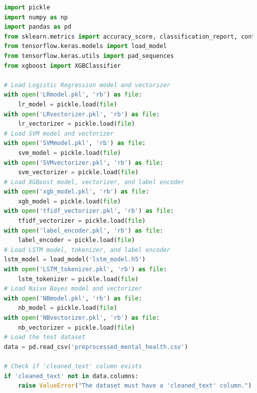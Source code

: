 \begin{tcolorbox}[colback=gray!5!white, colframe=gray!80!black, boxrule=0.5pt, title=Evaluate Meta-Learner and Ensemble Model]
    \begin{lstlisting}[language=Python]
import pickle
import numpy as np
import pandas as pd
from sklearn.metrics import accuracy_score, classification_report, confusion_matrix
from tensorflow.keras.models import load_model
from tensorflow.keras.utils import pad_sequences
from xgboost import XGBClassifier

# Load Logistic Regression model and vectorizer
with open('LRmodel.pkl', 'rb') as file:
    lr_model = pickle.load(file)
with open('LRvectorizer.pkl', 'rb') as file:
    lr_vectorizer = pickle.load(file)
# Load SVM model and vectorizer
with open('SVMmodel.pkl', 'rb') as file:
    svm_model = pickle.load(file)
with open('SVMvectorizer.pkl', 'rb') as file:
    svm_vectorizer = pickle.load(file)
# Load XGBoost model, vectorizer, and label encoder
with open('xgb_model.pkl', 'rb') as file:
    xgb_model = pickle.load(file)
with open('tfidf_vectorizer.pkl', 'rb') as file:
    tfidf_vectorizer = pickle.load(file)
with open('label_encoder.pkl', 'rb') as file:
    label_encoder = pickle.load(file)
# Load LSTM model, tokenizer, and label encoder
lstm_model = load_model('lstm_model.h5')
with open('LSTM_tokenizer.pkl', 'rb') as file:
    lstm_tokenizer = pickle.load(file)
# Load Naive Bayes model and vectorizer
with open('NBmodel.pkl', 'rb') as file:
    nb_model = pickle.load(file)
with open('NBvectorizer.pkl', 'rb') as file:
    nb_vectorizer = pickle.load(file)
# Load the test dataset
data = pd.read_csv('preprocessed_mental_health.csv')

# Check if 'cleaned_text' column exists
if 'cleaned_text' not in data.columns:
    raise ValueError("The dataset must have a 'cleaned_text' column.")
\end{lstlisting}
\end{tcolorbox}
 
